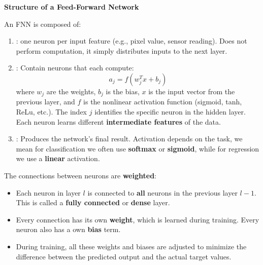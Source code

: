 \begin{flushleft}
    \textcolor{Green3}{ \textbf{Structure of a Feed-Forward Network}}
\end{flushleft}
An FNN is composed of:
\begin{enumerate}
    \item {}: one neuron per input feature (e.g., pixel value, sensor reading). Does not perform computation, it simply distributes inputs to the next layer.
    \item {}: Contain neurons that each compute:
    \begin{equation*}
        a_{j} = f\left(w_{j}^{T} x + b_{j}\right)
    \end{equation*}
    where $w_{j}$ are the weights, $b_{j}$ is the bias, $x$ is the input vector from the previous layer, and $f$ is the nonlinear activation function (sigmoid, tanh, ReLu, etc.). The index $j$ identifies the specific neuron in the hidden layer. Each neuron learns different \textbf{intermediate features} of the data.
    \item {}: Produces the network's final result. Activation depends on the task, we mean for classification we often use \textbf{softmax} or \textbf{sigmoid}, while for regression we use a \textbf{linear} activation.
\end{enumerate}
The connections between neurons are \textbf{weighted}:
\begin{itemize}
    \item Each neuron in layer $l$ is connected to \textbf{all} neurons in the previous layer $l-1$. This is called a \textbf{fully connected} or \textbf{dense} layer.
    \item Every connection has its own \textbf{weight}, which is learned during training. Every neuron also has a own \textbf{bias} term.
    \item During training, all these weights and biases are adjusted to minimize the difference between the predicted output and the actual target values.
\end{itemize}

